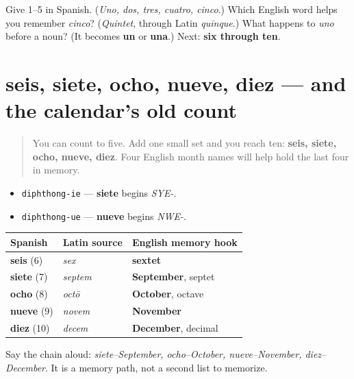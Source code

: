 \begin{tcolorbox}[breakable,colback=teal!4,colframe=teal!35!black,title={Before you move on}]
Give 1–5 in Spanish. (\emph{Uno, dos, tres, cuatro, cinco}.) Which English word helps you remember \emph{cinco}? (\emph{Quintet}, through Latin \emph{quīnque}.) What happens to \emph{uno} before a noun? (It becomes \textbf{un} or \textbf{una}.) Next: \textbf{six through ten}.
\end{tcolorbox}
\section[seis, siete, ocho, nueve, diez]{seis, siete, ocho, nueve, diez — and the calendar's old count}

\label{lesson:ES-C08-numeros-6-10}



\begin{quote}
You can count to five. Add one small set and you reach ten: \textbf{seis, siete, ocho, nueve, diez}. Four English month names will help hold the last four in memory.
\end{quote}

\begin{sounds}
\begin{itemize}
\raggedright
  \item \texttt{diphthong-ie} — \textbf{siete} begins \emph{SYE-}.
  \item \texttt{diphthong-ue} — \textbf{nueve} begins \emph{NWE-}.
\end{itemize}
\end{sounds}

\begin{cousinweb}
\noindent
\begin{tabularx}{\linewidth}{@{}>{\raggedright\arraybackslash}X>{\raggedright\arraybackslash}X>{\raggedright\arraybackslash}X@{}}
\toprule
\textbf{Spanish} & \textbf{Latin source} & \textbf{English memory hook} \\
\midrule
\textbf{seis} (6) & \emph{sex} & \textbf{sextet} \\
\textbf{siete} (7) & \emph{septem} & \textbf{September}, septet \\
\textbf{ocho} (8) & \emph{octō} & \textbf{October}, octave \\
\textbf{nueve} (9) & \emph{novem} & \textbf{November} \\
\textbf{diez} (10) & \emph{decem} & \textbf{December}, decimal \\
\bottomrule
\end{tabularx}

Say the chain aloud: \emph{siete–September, ocho–October, nueve–November, diez–December}. It is a memory path, not a second list to memorize.
\end{cousinweb}

